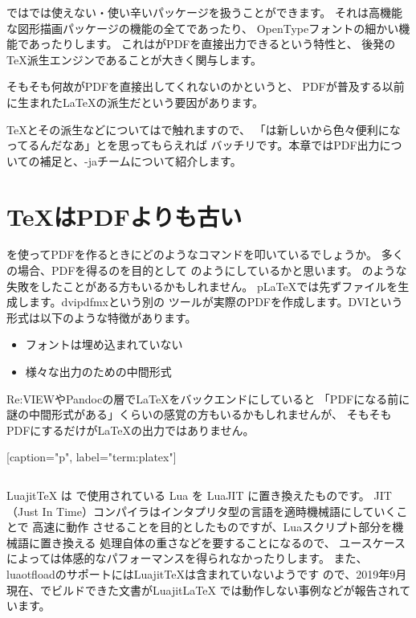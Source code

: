 \documentclass[main]{subfiles}
\begin{document}
\begin{abstract}
本書は\LuaLaTeX{}の入門書を目指した書籍となります。
では、\LuaLaTeX{}とは何なのでしょうか。

\end{abstract}

\LuaLaTeX{}では\pLaTeX{}では使えない・使い辛いパッケージを扱うことができます。
それは高機能な図形描画パッケージの機能の全てであったり、
OpenTypeフォントの細かい機能であったりします。
これは\LuaLaTeX{}がPDFを直接出力できるという特性と、
後発の\TeX{}派生エンジンであることが大きく関与します。

そもそも何故\pLaTeX{}がPDFを直接出してくれないのかというと、
PDFが普及する以前に生まれた\LaTeX{}の派生だという要因があります。

\TeX{}とその派生などについてはで触れますので、
「\LuaLaTeX{}は新しいから色々便利になってるんだなあ」とを思ってもらえれば
バッチリです。本章ではPDF出力についての補足と、\LuaTeX{}-jaチームについて紹介します。

\section{\TeX{}はPDFよりも古い}

\pLaTeX{}を使ってPDFを作るときにどのようなコマンドを叩いているでしょうか。
多くの場合、PDFを得るのを目的として
のようにしているかと思います。
のような失敗をしたことがある方もいるかもしれません。
p\LaTeX{}では先ずファイルを生成します。dvipdfmxという別の
ツールが実際のPDFを作成します。DVIという形式は以下のような特徴があります。
\begin{itemize}
\item{フォントは埋め込まれていない}
\item{様々な出力のための中間形式}
\end{itemize}

Re:VIEWやPandocの層で\LaTeX{}をバックエンドにしていると
「PDFになる前に謎の中間形式がある」くらいの感覚の方もいるかもしれませんが、
そもそもPDFにするだけが\LaTeX{}の出力ではありません。


[caption="p", label="term:platex"]

\begin{column}
Luajit\TeX{} は \LuaTeX{}で使用されている Lua を LuaJIT に置き換えたものです。
JIT（Just In Time）コンパイラはインタプリタ型の言語を適時機械語にしていくことで
高速に動作
させることを目的としたものですが、Luaスクリプト部分を機械語に置き換える
処理自体の重さなどを要することになるので、
ユースケースによっては体感的なパフォーマンスを得られなかったりします。
また、
luaotfloadのサポートにはLuajit\TeX{}は含まれていないようです\cite{luaotfload:issue:jit}
ので、2019年9月現在、\LuaLaTeX{}でビルドできた文書がLuajit\LaTeX{}
では動作しない事例などが報告されています\cite{texforum:jit}。
\end{column}
\end{document}
